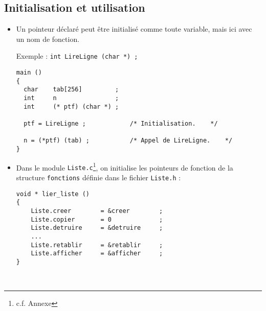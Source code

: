 \subsection*{Initialisation et utilisation}

    \begin{itemize} 
    
	\item Un pointeur d\'eclar\'e peut \^etre initialis\'e comme toute variable, mais
      ici avec un nom de fonction.

      Exemple :
\smallskip 
      {\tt int    LireLigne (char *) ;}
{\small
\begin{verbatim}
main ()
{
  char    tab[256]         ;
  int     n                ;
  int     (* ptf) (char *) ;

  ptf = LireLigne ;            /* Initialisation.    */

  n = (*ptf) (tab) ;           /* Appel de LireLigne.    */
}\end{verbatim}
}

\item Dans le module {\tt Liste.c}\footnote{c.f. Annexe},
on initialise les pointeurs de fonction
de la structure {\tt fonctions} d\'efinie dans le fichier {\tt Liste.h} :

{\small
\begin{verbatim}void * lier_liste () 
{
    Liste.creer        = &creer        ;
    Liste.copier       = 0             ;
    Liste.detruire     = &detruire     ;
    ...
    Liste.retablir     = &retablir     ;
    Liste.afficher     = &afficher     ; 
} \end{verbatim}

}
\end{itemize} 

\newpage
~

